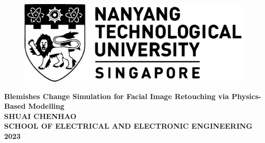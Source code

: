 \begin{titlepage}

\begin{figure}[h!]
\centering
\includegraphics[width=1\textwidth]{Title/NTU-LOGO-bw.pdf}
\caption*{}
\label{fig:entropy} 
\end{figure}

\vspace{1.5in}

\centering
\Huge{\textbf{Blemishes Change Simulation for Facial Image Retouching via Physics-Based Modelling}}\\[2.5in]

\LARGE{\textbf{SHUAI CHENHAO}}\\[0.5in]

\normalsize{\textbf{SCHOOL OF ELECTRICAL AND ELECTRONIC ENGINEERING}}\\[0.2in]


\large{\textbf{2023}}
\end{titlepage}
\newpage